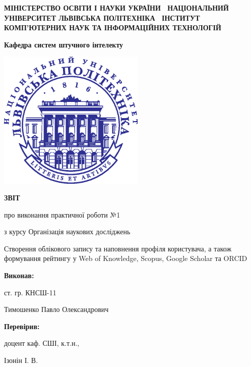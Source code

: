 \documentclass[oneside,14pt,a4paper]{extreport}
\newcommand \labno    {1}
\newcommand \course   {Організація наукових досліджень}
\newcommand \group    {11}
\newcommand \lecturer {Ізонін І. В.}
\newcommand \theme    {Створення облікового запису та наповнення профіля користувача, а також формування рейтингу у Web of Knowledge, Scopus, Google Scholar та ORCID}
\begin{document}
\begin{titlepage}

\centering
 \textbf{
  МІНІСТЕРСТВО ОСВІТИ І НАУКИ УКРАЇНИ \
  НАЦІОНАЛЬНИЙ УНІВЕРСИТЕТ \flqq{}ЛЬВІВСЬКА ПОЛІТЕХНІКА\frqq{} \
  ІНСТИТУТ КОМП’ЮТЕРНИХ НАУК ТА ІНФОРМАЦІЙНИХ ТЕХНОЛОГІЙ
 }

\vspace{0.5cm}
 \textbf{
  Кафедра систем штучного інтелекту
}

\vspace*{\fill}

  {
    \centering
    \includegraphics[width=7cm]{imgs/logo.eps}
  }

\vspace{1cm}

  {\textbf{ЗВІТ} \par{}
  {про виконання практичної роботи №\labno}
   \par}
  {з курсу \flqq{}\course\frqq{} \par}

\vspace{1cm} \theme

\raggedleft\vfill

 {\textbf{Виконав:} \par}
 {ст. гр. КНСШ-\group \par}
 {Тимошенко Павло Олександрович \par}


 {\textbf{Перевірив:} \par}
 {доцент каф. СШІ, к.т.н.,}
 {\lecturer \par}

\vspace{1cm}


\end{titlepage}
\end{document}
